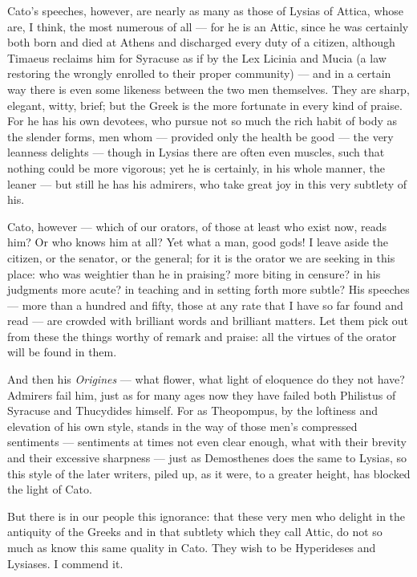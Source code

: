  Cato's speeches, however, are nearly as many as those of Lysias of Attica, whose are, I think, the most numerous of all — for he is an Attic, since he was certainly both born and died at Athens and discharged every duty of a citizen, although Timaeus reclaims him for Syracuse as if by the Lex Licinia and Mucia (a law restoring the wrongly enrolled to their proper community) — and in a certain way there is even some likeness between the two men themselves. They are sharp, elegant, witty, brief; but the Greek is the more fortunate in every kind of praise. For he has his own devotees, who pursue not so much the rich habit of body as the slender forms, men whom — provided only the health be good — the very leanness delights — though in Lysias there are often even muscles, such that nothing could be more vigorous; yet he is certainly, in his whole manner, the leaner — but still he has his admirers, who take great joy in this very subtlety of his.

 Cato, however — which of our orators, of those at least who exist now, reads him? Or who knows him at all? Yet what a man, good gods! I leave aside the citizen, or the senator, or the general; for it is the orator we are seeking in this place: who was weightier than he in praising? more biting in censure? in his judgments more acute? in teaching and in setting forth more subtle? His speeches — more than a hundred and fifty, those at any rate that I have so far found and read — are crowded with brilliant words and brilliant matters. Let them pick out from these the things worthy of remark and praise: all the virtues of the orator will be found in them.

 And then his \textit{Origines} — what flower, what light of eloquence do they not have? Admirers fail him, just as for many ages now they have failed both Philistus of Syracuse and Thucydides himself. For as Theopompus, by the loftiness and elevation of his own style, stands in the way of those men's compressed sentiments — sentiments at times not even clear enough, what with their brevity and their excessive sharpness — just as Demosthenes does the same to Lysias, so this style of the later writers, piled up, as it were, to a greater height, has blocked the light of Cato.

 But there is in our people this ignorance: that these very men who delight in the antiquity of the Greeks and in that subtlety which they call Attic, do not so much as know this same quality in Cato. They wish to be Hyperideses and Lysiases. I commend it.

